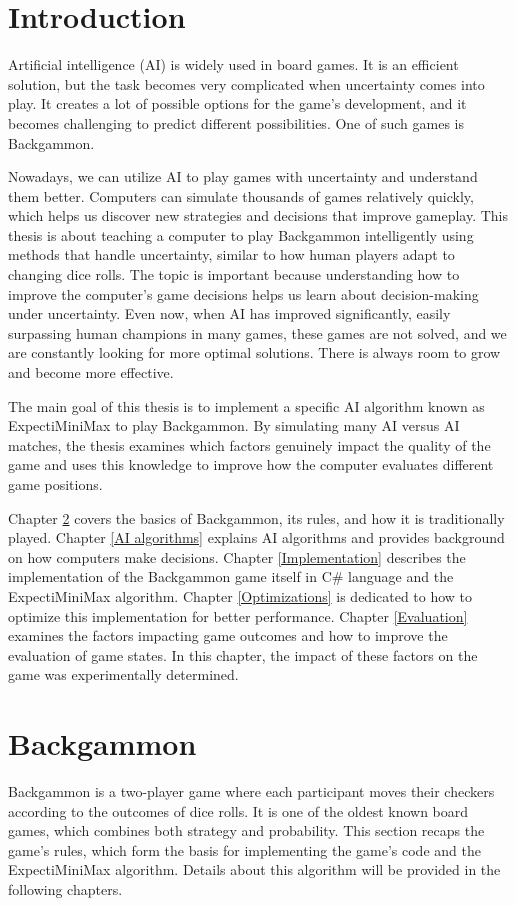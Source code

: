 \chapter{Introduction}
Artificial intelligence (AI) is widely used in board games. It is an efficient solution, but the task becomes very complicated when uncertainty comes into play. It creates a lot of possible options for the game's development, and it becomes challenging to predict different possibilities. One of such games is Backgammon.

Nowadays, we can utilize AI to play games with uncertainty and understand them better. Computers can simulate thousands of games relatively quickly, which helps us discover new strategies and decisions that improve gameplay. This thesis is about teaching a computer to play Backgammon intelligently using methods that handle uncertainty, similar to how human players adapt to changing dice rolls.
The topic is important because understanding how to improve the computer's game decisions helps us learn about decision-making under uncertainty.
Even now, when AI has improved significantly, easily surpassing human champions in many games, these games are not solved, and we are constantly looking for more optimal solutions. There is always room to grow and become more effective.

The main goal of this thesis is to implement a specific AI algorithm known as ExpectiMiniMax to play Backgammon. By simulating many AI versus AI matches, the thesis examines which factors genuinely impact the quality of the game and uses this knowledge to improve how the computer evaluates different game positions.

 Chapter \ref{Backgammon} covers the basics of Backgammon, its rules, and how it is traditionally played. Chapter \ref{AI algorithms} explains AI algorithms and provides background on how computers make decisions. Chapter \ref{Implementation} describes the implementation of the Backgammon game itself in C\# language and the ExpectiMiniMax algorithm. Chapter \ref{Optimizations} is dedicated to how to optimize this implementation for better performance. Chapter \ref{Evaluation} examines the factors impacting game outcomes and how to improve the evaluation of game states. In this chapter, the impact of these factors on the game was experimentally determined.

\chapter{Backgammon}\label{Backgammon}
Backgammon is a two-player game where each participant moves their checkers according to the outcomes of dice rolls. It is one of the oldest known board games, which combines both strategy and probability. 
This section recaps the game's rules, which form the basis for implementing the game's code and the ExpectiMiniMax algorithm. Details about this algorithm will be provided in the following chapters.

